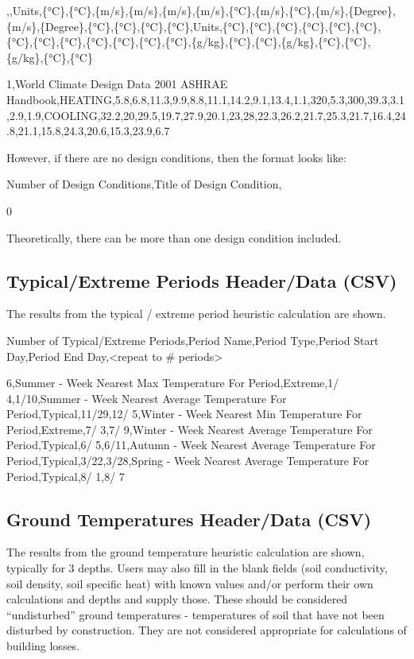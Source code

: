 ,,Units,\{°C\},\{°C\},\{m/s\},\{m/s\},\{m/s\},\{m/s\},\{°C\},\{m/s\},\{°C\},\{m/s\},\{Degree\}, \{m/s\},\{Degree\},\{°C\},\{°C\},\{°C\},\{°C\},Units,\{°C\},\{°C\},\{°C\},\{°C\},\{°C\},\{°C\}, \{°C\},\{°C\},\{°C\},\{°C\},\{°C\},\{°C\},\{°C\},\{g/kg\},\{°C\},\{°C\},\{g/kg\},\{°C\},\{°C\}, \{g/kg\},\{°C\},\{°C\}

1,World Climate Design Data 2001 ASHRAE Handbook,HEATING,5.8,6.8,11.3,9.9,8.8,11.1,14.2,9.1,13.4,1.1,320,5.3,300,39.3,3.1,2.9,1.9,COOLING,32.2,20,29.5,19.7,27.9,20.1,23,28,22.3,26.2,21.7,25.3,21.7,16.4,24.8,21.1,15.8,24.3,20.6,15.3,23.9,6.7

However, if there are no design conditions, then the format looks like:

Number of Design Conditions,Title of Design Condition,

0

Theoretically, there can be more than one design condition included.

\subsection{Typical/Extreme Periods Header/Data (CSV)}\label{typicalextreme-periods-headerdata-csv}

The results from the typical / extreme period heuristic calculation are shown.

Number of Typical/Extreme Periods,Period Name,Period Type,Period Start Day,Period End Day,\textless{}repeat to \# periods\textgreater{}

6,Summer - Week Nearest Max Temperature For Period,Extreme,1/ 4,1/10,Summer - Week Nearest Average Temperature For Period,Typical,11/29,12/ 5,Winter - Week Nearest Min Temperature For Period,Extreme,7/ 3,7/ 9,Winter - Week Nearest Average Temperature For Period,Typical,6/ 5,6/11,Autumn - Week Nearest Average Temperature For Period,Typical,3/22,3/28,Spring - Week Nearest Average Temperature For Period,Typical,8/ 1,8/ 7

\subsection{Ground Temperatures Header/Data (CSV)}\label{ground-temperatures-headerdata-csv}

The results from the ground temperature heuristic calculation are shown, typically for 3 depths. Users may also fill in the blank fields (soil conductivity, soil density, soil specific heat) with known values and/or perform their own calculations and depths and supply those. These should be considered ``undisturbed'' ground temperatures - temperatures of soil that have not been disturbed by construction. They are not considered appropriate for calculations of building losses.

